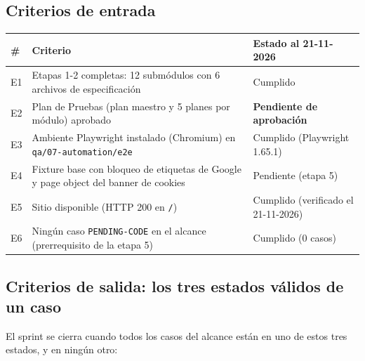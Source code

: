 \documentclass[11pt,a4paper]{article}
\begin{document}
\subsection{Criterios de entrada}

\begin{table}[H]
\centering\small
\begin{tabularx}{\textwidth}{@{}l X >{\raggedright\arraybackslash}p{}@{}}
\toprule
\# & Criterio & Estado al 21-11-2026 \\
\midrule
E1 & Etapas 1-2 completas: 12 submódulos con 6 archivos de especificación & Cumplido \\
E2 & Plan de Pruebas (plan maestro y 5 planes por módulo) aprobado & \textbf{Pendiente de aprobación} \\
E3 & Ambiente Playwright instalado (Chromium) en \texttt{qa/07-automation/e2e} & Cumplido (Playwright 1.65.1) \\
E4 & Fixture base con bloqueo de etiquetas de Google y page object del banner de cookies & Pendiente (etapa 5) \\
E5 & Sitio disponible (HTTP 200 en \texttt{/}) & Cumplido (verificado el 21-11-2026) \\
E6 & Ningún caso \texttt{PENDING-CODE} en el alcance (prerrequisito de la etapa 5) & Cumplido (0 casos) \\
\bottomrule
\end{tabularx}
\end{table}

\subsection{Criterios de salida: los tres estados válidos de un caso}

El sprint se cierra cuando todos los casos del alcance están en uno de estos tres estados, y en ningún otro:

\begin{center}
\end{center}
\end{document}
